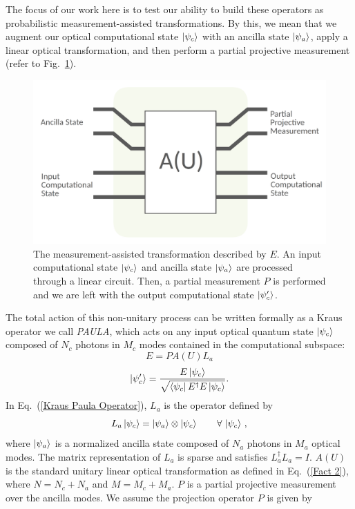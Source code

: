 \documentclass[aps,pra,twocolumn,superscriptaddress,floatfix,10pt]{revtex4}
\begin{document}
The focus of our work here is to test our ability to build these operators as probabilistic measurement-assisted transformations. By this, we mean that we augment our optical computational state $\ket{\psi_c}$ with an ancilla state $\ket{\psi_a}$, apply a linear optical transformation, and then perform a partial projective measurement (refer to Fig.~\ref{Figure - PAULA Operator}). 
 \begin{figure}[h]
 	\centering
 	\includegraphics[width=0.5 \textwidth]{./PAULA.pdf}
 	\caption{The measurement-assisted transformation described by $E$. An input computational state $\ket{\psi_c}$ and ancilla state $\ket{\psi_a}$ are processed through a linear circuit. Then, a partial measurement $P$ is performed and we are left with the output computational state $\ket{\psi_c^\prime}$.}
 	\label{Figure - PAULA Operator}
 \end{figure}
The total action of this non-unitary process can be written formally as a Kraus operator we call \textit{PAULA}, which acts on any input optical quantum state $\ket{\psi_{c}}$ composed of $N_c$ photons in $M_c$ modes contained in the computational subspace:
\begin{equation}
\label{Kraus Paula Operator}
E = P A(U) L_a
\end{equation} 
\begin{equation}
\ket{\psi_{c}^\prime} = \frac{E \ket{\psi_{c}}}{\sqrt{ \bra{\psi_c} E^\dagger E \ket{\psi_c} }}.
\end{equation}
In Eq.~(\ref{Kraus Paula Operator}), $L_a$ is the operator defined by
\begin{equation}
\label{Ancilla Linker}
L_a \ket{\psi_{c}} = \ket{\psi_a} \otimes \ket{\psi_{c}} \quad \quad  \forall \, \ket{\psi_{c}} \,,
\end{equation}
where $\ket{\psi_a}$ is a normalized ancilla state composed of $N_a$ photons in $M_a$ optical modes. The matrix representation of $L_a$ is sparse and satisfies $L_a^\dagger L_a = I$.
$A(U)$ is the standard unitary linear optical transformation as defined in Eq.~(\ref{Fact 2}), where $N=N_c+N_a$ and $M=M_c+M_a$. $P$ is a partial projective measurement over the ancilla modes. We assume the projection operator $P$ is given by
\end{document}
